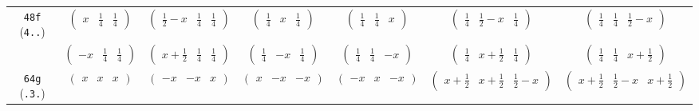 \documentclass[fleqn,9pt,landscape]{jsarticle}
\begin{document}
\begin{center}
\begin{longtable}{ccccccc}
{\tt 48f} ({\tt 4..}) & $ \begin{pmatrix} x & \frac{1}{4} & \frac{1}{4} \end{pmatrix} $ & $ \begin{pmatrix} \frac{1}{2} - x & \frac{1}{4} & \frac{1}{4} \end{pmatrix} $ & $ \begin{pmatrix} \frac{1}{4} & x & \frac{1}{4} \end{pmatrix} $ & $ \begin{pmatrix} \frac{1}{4} & \frac{1}{4} & x \end{pmatrix} $ & $ \begin{pmatrix} \frac{1}{4} & \frac{1}{2} - x & \frac{1}{4} \end{pmatrix} $ & $ \begin{pmatrix} \frac{1}{4} & \frac{1}{4} & \frac{1}{2} - x \end{pmatrix} $ \\
& $ \begin{pmatrix} - x & \frac{1}{4} & \frac{1}{4} \end{pmatrix} $ & $ \begin{pmatrix} x + \frac{1}{2} & \frac{1}{4} & \frac{1}{4} \end{pmatrix} $ & $ \begin{pmatrix} \frac{1}{4} & - x & \frac{1}{4} \end{pmatrix} $ & $ \begin{pmatrix} \frac{1}{4} & \frac{1}{4} & - x \end{pmatrix} $ & $ \begin{pmatrix} \frac{1}{4} & x + \frac{1}{2} & \frac{1}{4} \end{pmatrix} $ & $ \begin{pmatrix} \frac{1}{4} & \frac{1}{4} & x + \frac{1}{2} \end{pmatrix} $ \\ \hline
{\tt 64g} ({\tt .3.}) & $ \begin{pmatrix} x & x & x \end{pmatrix} $ & $ \begin{pmatrix} - x & - x & x \end{pmatrix} $ & $ \begin{pmatrix} x & - x & - x \end{pmatrix} $ & $ \begin{pmatrix} - x & x & - x \end{pmatrix} $ & $ \begin{pmatrix} x + \frac{1}{2} & x + \frac{1}{2} & \frac{1}{2} - x \end{pmatrix} $ & $ \begin{pmatrix} x + \frac{1}{2} & \frac{1}{2} - x & x + \frac{1}{2} \end{pmatrix} $ \\

\end{longtable}
\end{center}
\end{document}
